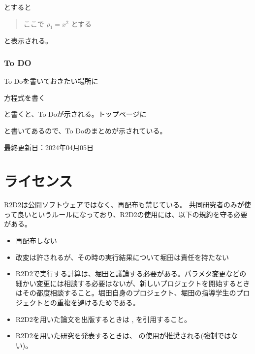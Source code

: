 \documentclass[letterpaper,10pt,dvipdfmx,report]{sphinxmanual}
\begin{document}
\sphinxAtStartPar
とすると
\begin{quote}

\sphinxAtStartPar
ここで \(\rho_1=x^2\) とする
\end{quote}

\sphinxAtStartPar
と表示される。


\subsection{To DO}
\label{\detokenize{sphinx:to-do}}
\sphinxAtStartPar
To Doを書いておきたい場所に

\begin{sphinxVerbatim}[commandchars=\\\{\}]
  方程式を書く
\end{sphinxVerbatim}

\sphinxAtStartPar
と書くと、To Doが示される。トップページに

\begin{sphinxVerbatim}[commandchars=\\\{\}]
\end{sphinxVerbatim}

\sphinxAtStartPar
と書いてあるので、To Doのまとめが示されている。

\sphinxAtStartPar
最終更新日：2024年04月05日


\chapter{ライセンス}
\label{\detokenize{index:id1}}
\sphinxAtStartPar
R2D2は公開ソフトウェアではなく、再配布も禁じている。
共同研究者のみが使って良いというルールになっており、R2D2の使用には、以下の規約を守る必要がある。
\begin{itemize}
\item {} 
\sphinxAtStartPar
再配布しない

\item {} 
\sphinxAtStartPar
改変は許されるが、その時の実行結果について堀田は責任を持たない

\item {} 
\sphinxAtStartPar
R2D2で実行する計算は、堀田と議論する必要がある。パラメタ変更などの細かい変更には相談する必要はないが、新しいプロジェクトを開始するときはその都度相談すること。堀田自身のプロジェクト、堀田の指導学生のプロジェクトとの重複を避けるためである。

\item {} 
\sphinxAtStartPar
R2D2を用いた論文を出版するときは ,  を引用すること。

\item {} 
\sphinxAtStartPar
R2D2を用いた研究を発表するときは、 の使用が推奨される(強制ではない)。

\end{itemize}
\end{document}
